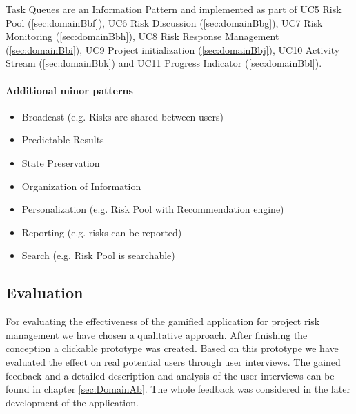Task Queues are an Information Pattern and implemented as part of \ac{UC}5 Risk Pool (\ref{sec:domainBbf}), \ac{UC}6 Risk Discussion (\ref{sec:domainBbg}), \ac{UC}7 Risk Monitoring (\ref{sec:domainBbh}), \ac{UC}8 Risk Response Management (\ref{sec:domainBbi}), \ac{UC}9 Project initialization (\ref{sec:domainBbj}), \ac{UC}10 Activity Stream (\ref{sec:domainBbk}) and \ac{UC}11 Progress Indicator (\ref{sec:domainBbl}).

\paragraph*{Additional minor patterns}

\begin{itemize}
	\item Broadcast (e.g. Risks are shared between users)
	\item Predictable Results
	\item State Preservation
	\item Organization of Information
	\item Personalization (e.g. Risk Pool with Recommendation engine)
	\item Reporting (e.g. risks can be reported)
	\item Search (e.g. Risk Pool is searchable)
\end{itemize}


\subsection{Evaluation}
\label{sec:domainCd}


For evaluating the effectiveness of the gamified application for project risk management we have chosen a qualitative approach. After finishing the conception a clickable prototype was created. Based on this prototype we have evaluated the effect on real potential users through user interviews. The gained feedback and a detailed description and analysis of the user interviews can be found in chapter \ref{sec:DomainAb}.
The whole feedback was considered in the later development of the application.